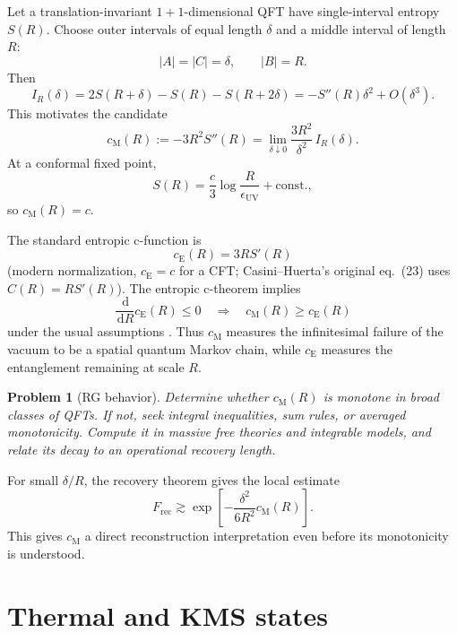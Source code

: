 \documentclass[11pt]{article}
\theoremstyle{accenttheorem}
\newtheorem{problem}[conjecture]{Problem}
\theoremstyle{definition}
\newcommand{\CMI}{I}
\newcommand{\dd}{\,\mathrm{d}}
\newcommand{\1}{\mathbf{1}}
\begin{document}
Let a translation-invariant \(1+1\)-dimensional QFT have single-interval entropy \(S(R)\).  Choose outer intervals of equal length \(\delta\) and a middle interval of length \(R\):
\[
 |A|=|C|=\delta,\qquad |B|=R.
\]
Then
\begin{equation}\label{eq:IRdelta}
 \CMI_R(\delta)
 =2S(R+\delta)-S(R)-S(R+2\delta)
 =-S''(R)\delta^2+O(\delta^3).
\end{equation}
This motivates the candidate
\begin{equation}\label{eq:cM}
 \boxed{
 c_{\mathrm M}(R):=-3R^2S''(R)
 =\lim_{\delta\downarrow0}
 \frac{3R^2}{\delta^2}\,\CMI_R(\delta).
 }
\end{equation}
At a conformal fixed point,
\[
 S(R)=\frac{c}{3}\log\frac{R}{\epsilon_{\mathrm{UV}}}+\mathrm{const.},
\]
so \(c_{\mathrm M}(R)=c\).

The standard entropic c-function is
\[
 c_{\mathrm E}(R)=3R S'(R)
\]
(modern normalization, \(c_{\mathrm E}=c\) for a CFT; Casini--Huerta's original eq.~(23) uses \(C(R)=RS'(R)\)).
The entropic c-theorem implies
\[
 \frac{\dd}{\dd R}c_{\mathrm E}(R)\le0
 \quad\Longrightarrow\quad
 c_{\mathrm M}(R)\ge c_{\mathrm E}(R)
\]
under the usual assumptions \cite{CasiniHuerta}.  Thus \(c_{\mathrm M}\) measures the infinitesimal failure of the vacuum to be a spatial quantum Markov chain, while \(c_{\mathrm E}\) measures the entanglement remaining at scale \(R\).

\begin{problem}[RG behavior]
Determine whether \(c_{\mathrm M}(R)\) is monotone in broad classes of QFTs.  If not, seek integral inequalities, sum rules, or averaged monotonicity.  Compute it in massive free theories and integrable models, and relate its decay to an operational recovery length.
\end{problem}

For small \(\delta/R\), the recovery theorem gives the local estimate
\begin{equation}\label{eq:cm-recovery}
 F_{\mathrm{rec}}
 \gtrsim
 \exp\!\left[-\frac{\delta^2}{6R^2}c_{\mathrm M}(R)\right].
\end{equation}
This gives \(c_{\mathrm M}\) a direct reconstruction interpretation even before its monotonicity is understood.

\section{Thermal and KMS states}
\end{document}
